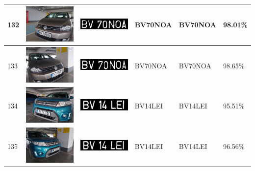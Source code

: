\documentclass[a4paper,12pt]{report}
\begin{document}
\begin{longtable}{| m{0.6cm} | m{3cm} | m{3cm} | m{1.8cm} | m{1.8cm} | m{1.8cm} |}
    132 & \includegraphics[width=3cm,keepaspectratio]{dataset/78_d1.jpg}  & \includegraphics[width=3cm,keepaspectratio]{segmentari/132.jpg} & BV70NOA             & BV70NOA              & 98.01\%    \\ \hline
    133 & \includegraphics[width=3cm,keepaspectratio]{dataset/78_s1.jpg}  & \includegraphics[width=3cm,keepaspectratio]{segmentari/133.jpg} & BV70NOA             & BV70NOA              & 98.65\%    \\ \hline
    134 & \includegraphics[width=3cm,keepaspectratio]{dataset/79_d1.jpg}  & \includegraphics[width=3cm,keepaspectratio]{segmentari/134.jpg} & BV14LEI             & BV14LEI              & 95.51\%    \\ \hline
    135 & \includegraphics[width=3cm,keepaspectratio]{dataset/79_s1.jpg}  & \includegraphics[width=3cm,keepaspectratio]{segmentari/135.jpg} & BV14LEI             & BV14LEI              & 96.56\%    \\ \hline

\end{longtable}
\end{document}
